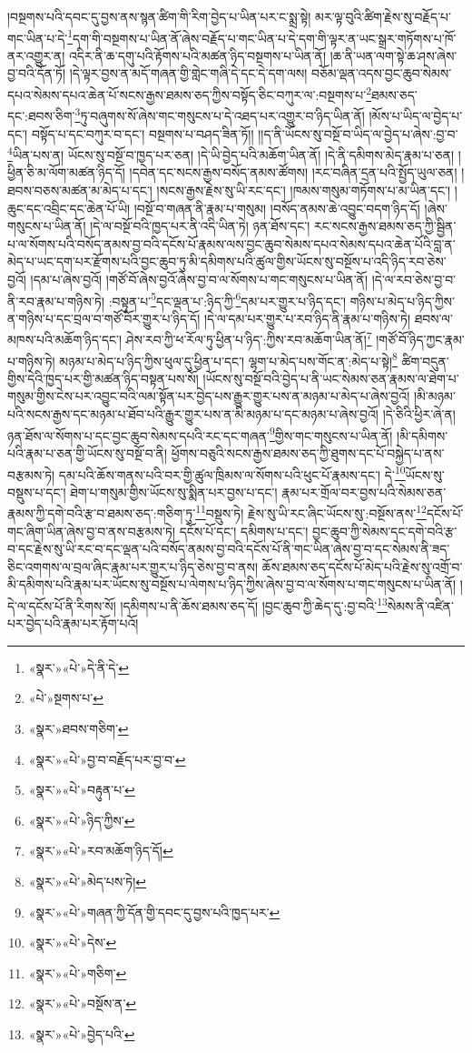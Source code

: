 །བསྔགས་པའི་དབང་དུ་བྱས་ནས་སྙན་ཚིག་གི་རིག་བྱེད་པ་ཡིན་པར་ང་སྨྲ་སྟེ། མར་ལྟ་བུའི་ཚིག་རྗེས་སུ་བརྗོད་པ་གང་ཡིན་པ་དེ་\footnote{«སྣར་»«པེ་»དེ་ནི་དེ་}དག་གི་བསྔགས་པ་ཡིན་ནོ་ཞེས་བརྗོད་པ་གང་ཡིན་པ་དེ་དག་གི་ལྟར་ན་ཡང་སྒྲར་གཏོགས་པ་ཁོ་ནར་འགྱུར་ན། འདིར་ནི་ཆ་དགུ་པའི་རྟོགས་པའི་མཚན་ཉིད་བསྔགས་པ་ཡིན་ནོ། །ཆ་ནི་ཡན་ལག་སྟེ་ཆ་ཤས་ཞེས་བྱ་བའི་དོན་ཏོ། །དེ་ལྟར་བྱས་ན་མདོ་གཞན་གྱི་གླེང་གཞི་དེ་དང་དེ་དག་ལས། བཅོམ་ལྡན་འདས་བྱང་ཆུབ་སེམས་དཔའ་སེམས་དཔའ་ཆེན་པོ་སངས་རྒྱས་ཐམས་ཅད་ཀྱིས་བསྟོད་ཅིང་བཀུར་ལ་:བསྔགས་པ་\footnote{«པེ་»སྔགས་པ་}ཐམས་ཅད་དང་:ཐབས་ཅིག་\footnote{«སྣར་»ཐབས་གཅིག་}ཏུ་བཞུགས་སོ་ཞེས་གང་གསུངས་པ་དེ་འཐད་པར་འགྱུར་བ་ཉིད་ཡིན་ནོ། །མོས་པ་ཡིད་ལ་བྱེད་པ་དང་། བསྟོད་པ་དང་བཀུར་བ་དང་། བསྔགས་པ་བཤད་ཟིན་ཏོ།། །།ད་ནི་ཡོངས་སུ་བསྔོ་བ་ཡིད་ལ་བྱེད་པ་ཞེས་:བྱ་བ་\footnote{«སྣར་»«པེ་»བྱ་བ་བརྗོད་པར་བྱ་བ་}ཡིན་པས་ན། ཡོངས་སུ་བསྔོ་བ་ཁྱད་པར་ཅན། །དེ་ཡི་བྱེད་པའི་མཆོག་ཡིན་ནོ། །དེ་ནི་དམིགས་མེད་རྣམ་པ་ཅན། །ཕྱིན་ཅི་མ་ལོག་མཚན་ཉིད་དོ། །དབེན་དང་སངས་རྒྱས་བསོད་ནམས་ཚོགས། །རང་བཞིན་དྲན་པའི་སྤྱོད་ཡུལ་ཅན། །ཐབས་བཅས་མཚན་མ་མེད་པ་དང་། །སངས་རྒྱས་རྗེས་སུ་ཡི་རང་དང་། །ཁམས་གསུམ་གཏོགས་པ་མ་ཡིན་དང་། །ཆུང་དང་འབྲིང་དང་ཆེན་པོ་ཡི། །བསྔོ་བ་གཞན་ནི་རྣམ་པ་གསུམ། །བསོད་ནམས་ཆེ་འབྱུང་བདག་ཉིད་དོ། །ཞེས་གསུངས་པ་ཡིན་ནོ། །དེ་ལ་བསྔོ་བའི་ཁྱད་པར་ནི་འདི་ཡིན་ཏེ། ཉན་ཐོས་དང་། རང་སངས་རྒྱས་ཐམས་ཅད་ཀྱི་སྦྱིན་པ་ལ་སོགས་པའི་བསོད་ནམས་བྱ་བའི་དངོས་པོ་རྣམས་ལས་བྱང་ཆུབ་སེམས་དཔའ་སེམས་དཔའ་ཆེན་པོའི་བླ་ན་མེད་པ་ཡང་དག་པར་རྫོགས་པའི་བྱང་ཆུབ་ཏུ་མི་དམིགས་པའི་ཚུལ་གྱིས་ཡོངས་སུ་བསྔོས་པ་འདི་ཉིད་རབ་ཅེས་བྱའོ། །དམ་པ་ཞེས་བྱའོ། །གཙོ་བོ་ཞེས་བྱའོ་ཞེས་བྱ་བ་ལ་སོགས་པ་གང་གསུངས་པ་ཡིན་ནོ། །དེ་ལ་རབ་ཅེས་བྱ་བ་ནི་རབ་རྣམ་པ་གཉིས་ཏེ། :བསྟུན་པ་\footnote{«སྣར་»«པེ་»བརྟུན་པ་}དང་ལྡན་པ་:ཉིད་ཀྱི་\footnote{«སྣར་»«པེ་»ཉིད་ཀྱིས་}དམ་པར་གྱུར་པ་ཉིད་དང་། གཉིས་པ་མེད་པ་ཉིད་ཀྱིས་ན་གཉིས་པ་དང་བྲལ་བ་གཙོ་བོར་གྱུར་པ་ཉིད་དོ། །དེ་ལ་དམ་པར་གྱུར་པ་རབ་ཉིད་ནི་རྣམ་པ་གཉིས་ཏེ། ཐབས་ལ་མཁས་པའི་མཆོག་ཉིད་དང་། ཤེས་རབ་ཀྱི་ཕ་རོལ་ཏུ་ཕྱིན་པ་ཉིད་:ཀྱིས་རབ་མཆོག་ཡིན་ནོ།\footnote{«སྣར་»«པེ་»རབ་མཆོག་ཉིད་དོ།} །གཙོ་བོ་ཉིད་ཀྱང་རྣམ་པ་གཉིས་ཏེ། མཉམ་པ་མེད་པ་ཉིད་ཀྱིས་ཕུལ་དུ་ཕྱིན་པ་དང་། ལྷག་པ་མེད་པས་གོང་ན་:མེད་པ་སྟེ།\footnote{«སྣར་»«པེ་»མེད་པས་ཏེ།} ཚིག་བདུན་གྱིས་དེའི་ཁྱད་པར་གྱི་མཚན་ཉིད་བསྟན་པས་སོ། །ཡོངས་སུ་བསྔོ་བའི་བྱེད་པ་ནི་ཡང་སེམས་ཅན་རྣམས་ལ་ཐེག་པ་གསུམ་གྱིས་ངེས་པར་འབྱུང་བའི་ལམ་སྟོན་པར་བྱེད་པས་རྒྱུར་གྱུར་པས་ན་མཉམ་པ་མེད་པ་ཞེས་བྱའོ། །མི་མཉམ་པའི་སངས་རྒྱས་དང་མཉམ་པ་ཐོབ་པའི་རྒྱུར་གྱུར་པས་ན་མི་མཉམ་པ་དང་མཉམ་པ་ཞེས་བྱའོ། །དེ་ཅིའི་ཕྱིར་ཞེ་ན། ཉན་ཐོས་ལ་སོགས་པ་དང་བྱང་ཆུབ་སེམས་དཔའི་རང་དང་གཞན་\footnote{«སྣར་»«པེ་»གཞན་ཀྱི་དོན་གྱི་དབང་དུ་བྱས་པའི་ཁྱད་པར་}གྱིས་གང་གསུངས་པ་ཡིན་ནོ། །མི་དམིགས་པའི་རྣམ་པ་ཅན་གྱི་ཡོངས་སུ་བསྔོ་བ་ནི། ཕྱོགས་བཅུའི་སངས་རྒྱས་ཐམས་ཅད་ཀྱི་ཐུགས་དང་པོ་བསྐྱེད་པ་ནས་བརྩམས་ཏེ། དམ་པའི་ཆོས་གནས་པའི་བར་གྱི་ཚུལ་ཁྲིམས་ལ་སོགས་པའི་ཕུང་པོ་རྣམས་དང་། དེ་\footnote{«སྣར་»«པེ་»དེས་}ཡོངས་སུ་བསྡུས་པ་དང་། ཐེག་པ་གསུམ་གྱིས་ཡོངས་སུ་སྨིན་པར་བྱས་པ་དང་། རྣམ་པར་གྲོལ་བར་བྱས་པའི་སེམས་ཅན་རྣམས་ཀྱི་དགེ་བའི་རྩ་བ་ཐམས་ཅད་:གཅིག་ཏུ་\footnote{«སྣར་»«པེ་»གཅིག་}བསྡུས་ཏེ། རྗེས་སུ་ཡི་རང་ཞིང་ཡོངས་སུ་:བསྔོས་ནས་\footnote{«སྣར་»«པེ་»བསྔོས་ན་}དངོས་པོ་གང་ཞིག་ཡིན་ཞེས་བྱ་བ་ནས་བརྩམས་ཏེ། དངོས་པོ་དང་། དམིགས་པ་དང་། བྱང་ཆུབ་ཀྱི་སེམས་དང་དགེ་བའི་རྩ་བ་དང་རྗེས་སུ་ཡི་རང་བ་དང་ལྡན་པའི་བསོད་ནམས་བྱ་བའི་དངོས་པོ་ནི་གང་ཡིན་ཞེས་བྱ་བ་དང་སེམས་ནི་ཟད་ཅིང་འགགས་ལ་བྲལ་ཞིང་རྣམ་པར་གྱུར་པ་ཉིད་ཅེས་བྱ་བ་ནས། ཆོས་ཐམས་ཅད་དངོས་པོ་མེད་པའི་རྗེས་སུ་འགྲོ་བ་མི་དམིགས་པའི་རྣམ་པར་ཡོངས་སུ་བསྔོས་པ་ལེགས་པ་ཉིད་ཀྱིས་ཞེས་བྱ་བ་ལ་སོགས་པ་གང་གསུངས་པ་ཡིན་ནོ། །དེ་ལ་དངོས་པོ་ནི་རིགས་སོ། །དམིགས་པ་ནི་ཆོས་ཐམས་ཅད་དོ། །བྱང་ཆུབ་ཀྱི་ཆེད་དུ་:བྱ་བའི་\footnote{«སྣར་»«པེ་»བྱེད་པའི་}སེམས་ནི་འཛིན་པར་བྱེད་པའི་རྣམ་པར་རྟོག་པའོ། 